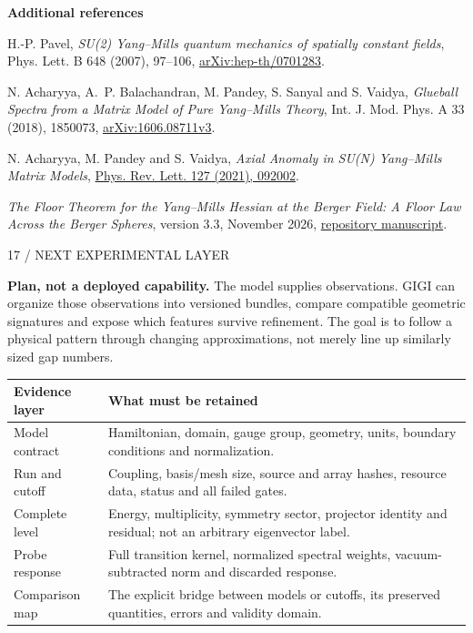 \documentclass[11pt,letterpaper]{article}
\theoremstyle{plain}
\theoremstyle{definition}
\newcommand{\eyebrow}[1]{{\sffamily\small\color{teal}#1}\par}
\newcommand{\pagetitle}[2]{\eyebrow{#1}\vspace{3pt}{\LARGE #2}\par\vspace{5pt}}
\begin{document}
{\small\raggedright
\textbf{Additional references}\par
[4] H.-P. Pavel, \emph{SU(2) Yang--Mills quantum mechanics of spatially constant
fields}, Phys. Lett. B 648 (2007), 97--106,
\href{https://arxiv.org/abs/hep-th/0701283}{arXiv:hep-th/0701283}.
\par [5] N. Acharyya, A.~P. Balachandran, M. Pandey, S. Sanyal and S. Vaidya,
\emph{Glueball Spectra from a Matrix Model of Pure Yang--Mills Theory},
Int. J. Mod. Phys. A 33 (2018), 1850073,
\href{https://arxiv.org/abs/1606.08711}{arXiv:1606.08711v3}.
\par [6] N. Acharyya, M. Pandey and S. Vaidya,
\emph{Axial Anomaly in SU(N) Yang--Mills Matrix Models},
\href{https://doi.org/10.1103/PhysRevLett.127.092002}{Phys. Rev. Lett. 127 (2021), 092002}.
\par [7] \emph{The Floor Theorem for the Yang--Mills Hessian at the Berger
Field: A Floor Law Across the Berger Spheres}, version 3.3, November 2026,
\href{https://github.com/nurdymuny/gigi/blob/8dece6505f127eb39bde73fcc942a9879aace8d5/docs/papers/berger-spectrum/paper.tex}{repository manuscript}.
}

\newpage
\pagetitle{17 / NEXT EXPERIMENTAL LAYER}{Use GIGI to connect evidence across models}
\textbf{Plan, not a deployed capability.}
The model supplies observations. GIGI can organize those observations into
versioned bundles, compare compatible geometric signatures and expose which
features survive refinement. The goal is to follow a physical pattern through
changing approximations, not merely line up similarly sized gap numbers.

\begin{center}\small
\begin{tabular}{@{}p{1.35in}p{4.85in}@{}}\toprule
\textbf{Evidence layer} & \textbf{What must be retained}\\\midrule
Model contract & Hamiltonian, domain, gauge group, geometry, units, boundary conditions and normalization.\\[4pt]
Run and cutoff & Coupling, basis/mesh size, source and array hashes, resource data, status and all failed gates.\\[4pt]
Complete level & Energy, multiplicity, symmetry sector, projector identity and residual; not an arbitrary eigenvector label.\\[4pt]
Probe response & Full transition kernel, normalized spectral weights, vacuum-subtracted norm and discarded response.\\[4pt]
Comparison map & The explicit bridge between models or cutoffs, its preserved quantities, errors and validity domain.\\\bottomrule
\end{tabular}
\end{center}
\end{document}
